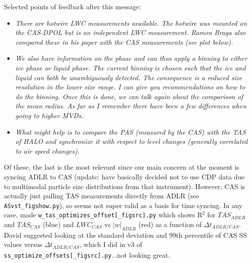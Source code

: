 \documentclass{article}
\begin{document}
\begin{itemize}
	\indent Selected points of feedback after this message:
	\begin{itemize}
		\item \emph{There are hotwire LWC measurements available. The hotwire was mounted on the CAS-DPOL but is an independent LWC measurement.  Ramon Braga also compared these in his paper with the CAS measurements (see plot below).} 
		\item \emph{We also have information on the phase and can thus apply a binning to either ice phase or liquid phase.  The current binning is chosen such that the ice and liquid can both be unambiguously detected. The consequence is a reduced size resolution in the lower size range. I can give you recommendations on how to do the binning. Once this is done, we can talk again about the comparison of the mean radius. As far as I remember there have been a few differences when going to higher MVDs.} 
		\item \emph{What might help is to compare the PAS (measured by the CAS) with the TAS of HALO and synchronize it with respect to level changes (generally correlated to air speed changes).} 
	\end{itemize}
	\indent Of these, the last is the most relevant since our main concern at the moment is syncing ADLR to CAS (update: have basically decided not to use CDP data due to multimodal particle size distributions from that instrument). However, CAS is actually just pulling TAS measurements directly from ADLR (see \texttt{ASvst\_figshow.py}), so seems not super valid as a basis for time syncing. In any case, made \texttt{w\_tas\_optimizes\_offset[\_figsrc].py} which shows R$^2$ for $TAS_{ADLR}$ and $TAS_{CAS}$ (blue) and $LWC_{CAS}$ vs $|w|_{ADLR}$ (red) as a function of $\Delta t_{ADLR/CAS}$. David suggested looking at the standard deviation and 99th percentile of CAS SS values versus $\Delta t_{ADLR/CAS}$, which I did in v3 of \texttt{ss\_optimize\_offsets[\_figsrc].py}...not looking great.
\end{itemize}
\end{document}
